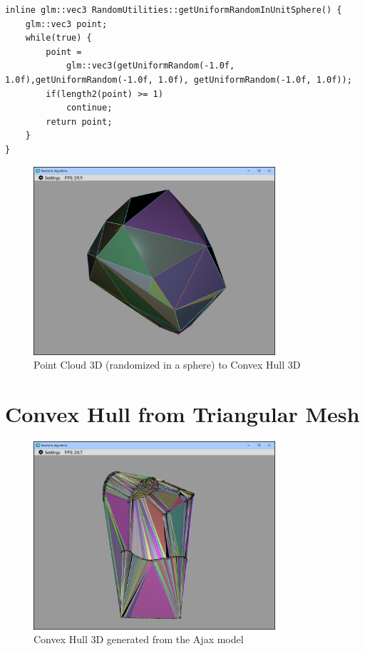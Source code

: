 \documentclass[12pt,a4paper,english]{article}
\begin{document}
\begin{verbatim}
inline glm::vec3 RandomUtilities::getUniformRandomInUnitSphere() {
    glm::vec3 point;
    while(true) {
        point =
            glm::vec3(getUniformRandom(-1.0f, 1.0f),getUniformRandom(-1.0f, 1.0f), getUniformRandom(-1.0f, 1.0f));
        if(length2(point) >= 1)
            continue;
        return point;
    }
}
\end{verbatim}

\begin{figure}[H]
    \centering
    \includegraphics[width=0.8\textwidth]{p4-2-b}
    \caption[]{Point Cloud 3D (randomized in a sphere) to Convex Hull 3D}
    \label{fig:p4-2-b}
\end{figure}

\section{Convex Hull from Triangular Mesh}

\begin{figure}[H]
    \centering
    \includegraphics[width=0.8\textwidth]{p4-3-a}
    \caption[]{Convex Hull 3D generated from the Ajax model}
    \label{fig:p4-3-a}
\end{figure}
\end{document}
